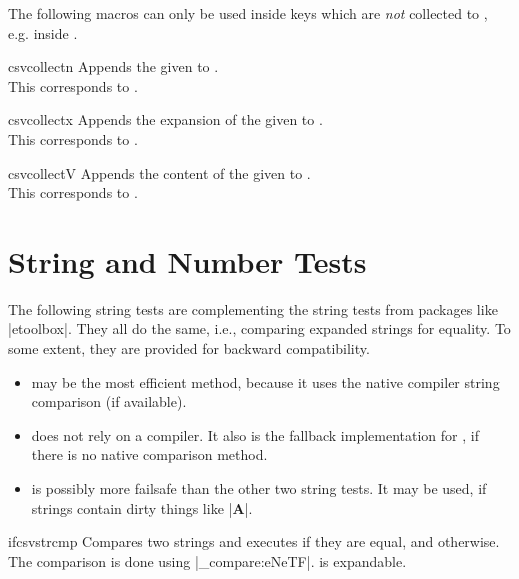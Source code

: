 \documentclass[a4paper,11pt]{ltxdoc}
\begin{document}
The following macros can only be used inside keys which are \emph{not}
collected to , e.g. inside .

\begin{docCommand}[doc new=2021-07-06]{csvcollectn}{}
  Appends the given  to .\\
  This corresponds to .
\end{docCommand}


\begin{docCommand}[doc new=2021-07-06]{csvcollectx}{}
  Appends the expansion of the given  to .\\
  This corresponds to .
\end{docCommand}

\begin{docCommand}[doc new=2021-07-06]{csvcollectV}{}
  Appends the content of the given  to .\\
  This corresponds to .
\end{docCommand}


\clearpage
\section{String and Number Tests}\label{sec:stringtests}%

The following string tests are complementing the string tests
from packages like |etoolbox|. They all do the same, i.e.,
comparing expanded strings for equality. To some extent, they are
provided for backward compatibility.
\begin{itemize}
\item{} may be the most efficient method, because it uses
  the  native compiler string comparison (if available).
\item{} does not rely on a compiler. It also is the
  fallback implementation for , if there is no
  native comparison method.
\item{} is possibly more failsafe than the other two
  string tests. It may be used, if strings contain dirty things like |\textbf{A}|.
\end{itemize}
\medskip

\begin{docCommand}[doc new and updated={2016-07-01}{2021-06-28}]{ifcsvstrcmp}{}
  Compares two strings and executes  if they are equal, and  otherwise.
  The comparison is done using |\str_compare:eNeTF|.
   is expandable.
\end{docCommand}
\end{document}
